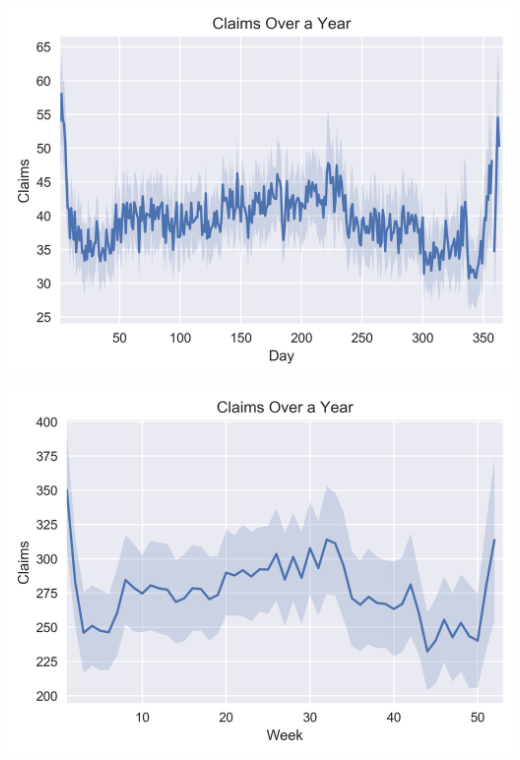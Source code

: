 \documentclass{beamer}
\begin{document}
\begin{frame}
	\includegraphics[keepaspectratio, width = \textwidth, height = \textheight]{../plots/avg_year_day}
\end{frame}

\begin{frame}
	\includegraphics[keepaspectratio, width = \textwidth, height = \textheight]{../plots/avg_year}
\end{frame}
\end{document}
